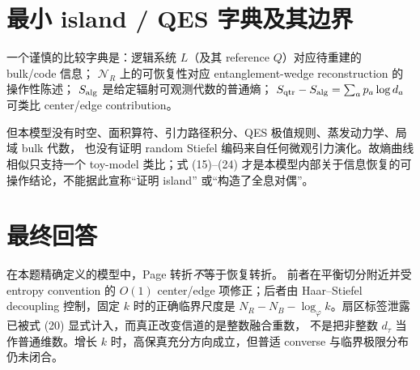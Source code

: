 \documentclass[UTF8,11pt,a4paper]{ctexart}
\theoremstyle{definition}
\newcommand{\cN}{\mathcal N}
\newcommand{\phiG}{\varphi}
\begin{document}
\section{最小 island / QES 字典及其边界}

一个谨慎的比较字典是：逻辑系统 $L$（及其 reference $Q$）对应待重建的 bulk/code 信息；
$\cN_R$ 上的可恢复性对应 entanglement-wedge reconstruction 的操作性陈述；
$S_{\rm alg}$ 是给定辐射可观测代数的普通熵；
$S_{\rm qtr}-S_{\rm alg}=\sum_ap_a\log d_a$ 可类比 center/edge contribution。

但本模型没有时空、面积算符、引力路径积分、QES 极值规则、蒸发动力学、局域 bulk 代数，
也没有证明 random Stiefel 编码来自任何微观引力演化。故熵曲线相似只支持一个 toy-model
类比；式 (15)--(24) 才是本模型内部关于信息恢复的可操作结论，不能据此宣称“证明 island”
或“构造了全息对偶”。

\section*{最终回答}

在本题精确定义的模型中，Page 转折\emph{不}等于恢复转折。
前者在平衡切分附近并受 entropy convention 的 $O(1)$ center/edge 项修正；后者由
Haar--Stiefel decoupling 控制，固定 $k$ 时的正确临界尺度是
$N_R-N_B-\log_{\phiG}k$。扇区标签泄露已被式 (20) 显式计入，而真正改变信道的是整数融合重数，
不是把非整数 $d_\tau$ 当作普通维数。增长 $k$ 时，高保真充分方向成立，但普适 converse
与临界极限分布仍未闭合。
\end{document}
